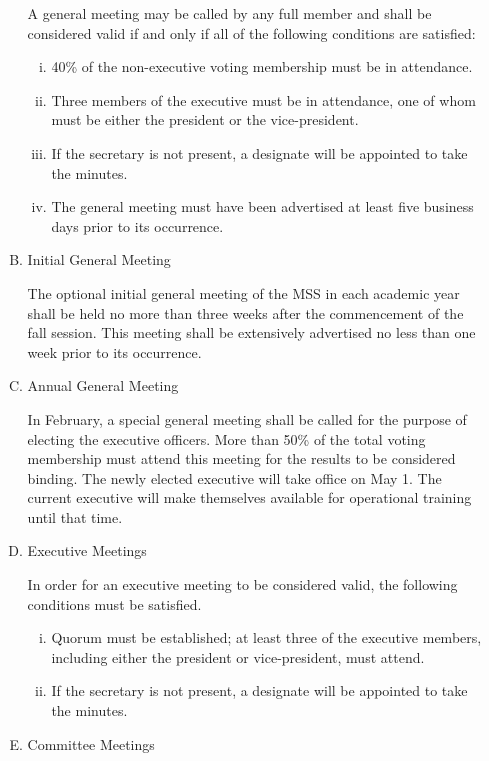 \documentclass[11pt]{article}
\begin{document}
\begin{enumerate}[I.]
\begin{enumerate}[A)]
      A general meeting may be called by any full member and shall be
        considered valid if and only if all of the following conditions are
        satisfied:
        \begin{enumerate}[i)]
          \item 40\% of the non-executive voting membership must be in
            attendance.
          \item Three members of the executive must be in attendance, one of
            whom must be either the president or the vice-president.
          \item If the secretary is not present, a designate will be appointed
            to take the minutes.
          \item The general meeting must have been advertised at least five
            business days prior to its occurrence.
        \end{enumerate}
      \item Initial General Meeting

      The optional initial general meeting of the MSS in each academic year shall be
        held no more than three weeks after the commencement of the fall
        session. This meeting shall be extensively advertised no less than one
        week prior to its occurrence.

      \item Annual General Meeting

      In February, a special general meeting shall be called for the purpose of
        electing the executive officers. More than 50\% of the total voting
        membership must attend this meeting for the results to be considered
        binding. The newly elected executive will take office on May 1. The
        current executive will make themselves available for operational
        training until that time.

      \item Executive Meetings

      In order for an executive meeting to be considered valid, the following
        conditions must be satisfied.
        \begin{enumerate}[i)]
          \item Quorum must be established; at least three of the executive
            members, including either the president or vice-president, must
            attend.
          \item  If the secretary is not present, a designate will be appointed
            to take the minutes.
        \end{enumerate}
      \item Committee Meetings


\end{enumerate}
\end{enumerate}
\end{document}
